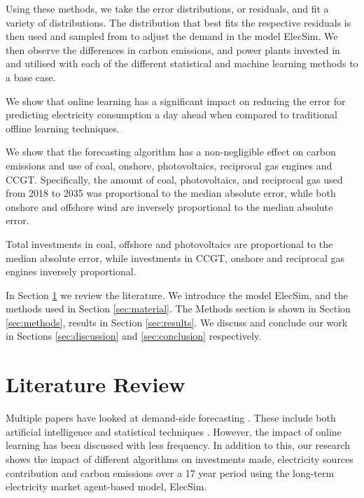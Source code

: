 \documentclass[final,3p,times,twocolumn,numbers]{elsarticle}
\begin{document}


Using these methods, we take the error distributions, or residuals, and fit a variety of distributions. The distribution that best fits the respective residuals is then used and sampled from to adjust the demand in the model ElecSim. We then observe the differences in carbon emissions, and power plants invested in and utilised with each of the different statistical and machine learning methods to a base case.





We show that online learning has a significant impact on reducing the error for predicting electricity consumption a day ahead when compared to traditional offline learning techniques.

We show that the forecasting algorithm has a non-negligible effect on carbon emissions and use of coal, onshore, photovoltaics, reciprocal gas engines and CCGT. Specifically, the amount of coal, photovoltaics, and reciprocal gas used from 2018 to 2035 was proportional to the median absolute error, while both onshore and offshore wind are inversely proportional to the median absolute error.

Total investments in coal, offshore and photovoltaics are proportional to the median absolute error, while investments in CCGT, onshore and reciprocal gas engines inversely proportional.




In Section \ref{sec:lit-review} we review the literature. We introduce the model ElecSim, and the methods used in Section \ref{sec:material}. The Methods section is shown in Section \ref{sec:methods}, results in Section \ref{sec:results}. We discuss and conclude our work in Sections \ref{sec:discussion} and \ref{sec:conclusion} respectively.

\section{Literature Review}
\label{sec:lit-review}

Multiple papers have looked at demand-side forecasting \cite{Singh2012}. These include both artificial intelligence \cite{Kim2000, Tiong2008,Quilumba2014} and statistical techniques \cite{Nazarko2005ARIMAApproach,Huang2003,Nguyen2017}. However, the impact of online learning has been discussed with less frequency. In addition to this, our research shows the impact of different algorithms on investments made, electricity sources contribution and carbon emissions over a 17 year period using the long-term electricity market agent-based model, ElecSim.
\end{document}
